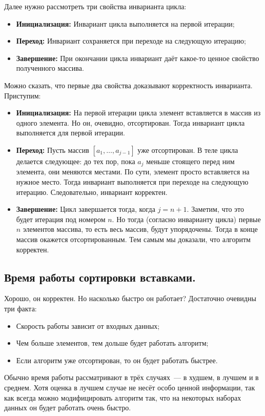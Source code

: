 \documentclass[a4paper,12pt]{article}
\begin{document}
Далее нужно рассмотреть три свойства инварианта цикла:
\begin{itemize}
	\item \textbf{Инициализация:} Инвариант цикла выполняется на первой итерации;
	
	\item \textbf{Переход:} Инвариант сохраняется при переходе на следующую итерацию;
	
	\item \textbf{Завершение:} При окончании цикла инвариант даёт какое-то ценное свойство полученного массива.
	\end{itemize}
	Можно сказать, что первые два свойства доказывают корректность инварианта. Приступим:
	\begin{itemize}
		\item \textbf{Инициализация:} На первой итерации цикла элемент вставляется в массив из одного элемента. Но он, очевидно, отсортирован. Тогда инвариант цикла выполняется для первой итерации.
		
		\item \textbf{Переход:} Пусть массив $[a_1, \ldots, a_{j - 1}]$ уже отсортирован. В теле цикла делается следующее: до тех пор, пока $a_{j}$ меньше стоящего перед ним элемента, они меняются местами. По сути, элемент просто вставляется на нужное место. Тогда инвариант выполняется при переходе на следующую итерацию. Следовательно, инвариант корректен.
		
		\item \textbf{Завершение:} Цикл завершается тогда, когда $j = n + 1$. Заметим, что это будет итерация под номером $n$. Но тогда (согласно инварианту цикла) первые $n$ элементов массива, то есть весь массив, будут упорядочены. Тогда в конце массив окажется отсортированным. Тем самым мы доказали, что алгоритм корректен.
		\end{itemize}

\subsection{Время работы сортировки вставками.}
Хорошо, он корректен. Но насколько быстро он работает? Достаточно очевидны три факта:
\begin{itemize}
	\item Скорость работы зависит от входных данных;
	\item Чем больше элементов, тем дольше будет работать алгоритм;
	\item Если алгоритм уже отсортирован, то он будет работать быстрее.
	\end{itemize}
	Обычно время работы рассматривают в трёх случаях~--- в худшем, в лучшем и в среднем. Хотя оценка в лучшем случае не несёт особо ценной информации, так как всегда можно модифицировать алгоритм так, что на некоторых наборах данных он будет работать очень быстро.
	
\end{document}
